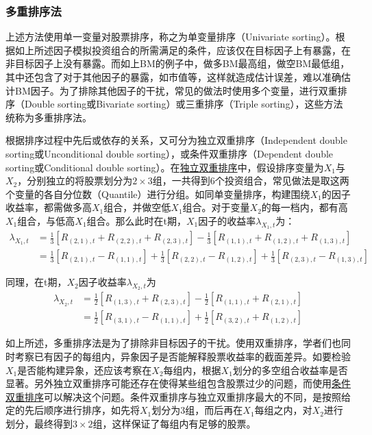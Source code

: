 \documentclass[11pt]{article}
\begin{document}
\subsubsection{多重排序法}

上述方法使用单一变量对股票排序，称之为单变量排序（Univariate sorting）。根据如上所述因子模拟投资组合的所需满足的条件，应该仅在目标因子上有暴露，在非目标因子上没有暴露。而如上BM的例子中，做多BM最高组，做空BM最低组，其中还包含了对于其他因子的暴露，如市值等，这样就造成估计误差，难以准确估计BM因子。为了排除其他因子的干扰，常见的做法时使用多个变量，进行双重排序（Double sorting或Bivariate sorting）或三重排序（Triple sorting），这些方法统称为多重排序法。

根据排序过程中先后或依存的关系，又可分为独立双重排序（Independent double sorting或Unconditional double sorting），或条件双重排序（Dependent double sorting或Conditional double sorting）。在\uline{独立双重排序}中，假设排序变量为$X_1$与$X_2$，分别独立的将股票划分为$ 2 \times 3$组，一共得到6个投资组合，常见做法是取这两个变量的各自分位数（Quantile）进行分组。如同单变量排序，构建围绕$X_1$的因子收益率，都需做多高$X_1$组合，并做空低$X_1$组合。对于变量$X_2$的每一档内，都有高$X_1$组合，与低高$X_1$组合。那么此时在t期，$X_1$因子的收益率$\lambda_{X_1,t}$为：
\begin{align*}
    \lambda_{X_1,t} &= \frac{1}{3} \left[ R_{(2,1),t} + R_{(2,2),t} + R_{(2,3),t} \right] - \frac{1}{3} \left[R_{(1,1),t} + R_{(1,2),t} + R_{(1,3),t} \right] \\
    &= \frac{1}{3} \left[ R_{(2,1),t} - R_{(1,1),t} \right] + \frac{1}{3} \left[R_{(2,2),t} - R_{(1,2),t} \right] + \frac{1}{3} \left[ R_{(2,3),t} - R_{(1,3),t} \right]
\end{align*}

同理，在t期，$X_2$因子收益率$\lambda_{X_2,t}$为
\begin{align*}
    \lambda_{X_2,t} &= \frac{1}{2} \left[ R_{(1,3),t} + R_{(2,3),t} \right] - \frac{1}{2} \left[R_{(1,1),t} + R_{(2,1),t} \right] \\
    &= \frac{1}{2} \left[ R_{(3,1),t} - R_{(1,1),t} \right] + \frac{1}{2} \left[R_{(3,2),t} + R_{(1,2),t} \right]
\end{align*}

如上所述，多重排序法是为了排除非目标因子的干扰。使用双重排序，学者们也同时考察已有因子的每组内，异象因子是否能解释股票收益率的截面差异。如要检验$X_1$是否能构建异象，还应该考察在$X_2$每组内，根据$X_1$划分的多空组合收益率是否显著。另外独立双重排序可能还存在使得某些组包含股票过少的问题，而使用\uline{条件双重排序}可以解决这个问题。条件双重排序与独立双重排序最大的不同，是按照给定的先后顺序进行排序，如先将$X_1$划分为3组，而后再在$X_1$每组之内，对$X_2$进行划分，最终得到$3\times 2$组，这样保证了每组内有足够的股票。
\end{document}
